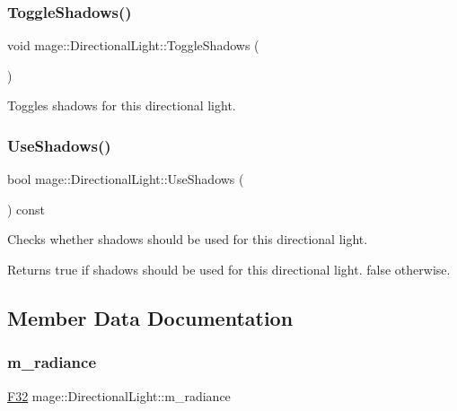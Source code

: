 \subsubsection{\texorpdfstring{Toggle\+Shadows()}{ToggleShadows()}}
{\footnotesize\ttfamily void mage\+::\+Directional\+Light\+::\+Toggle\+Shadows (\begin{DoxyParamCaption}{ }\end{DoxyParamCaption})\hspace{0.3cm}{\ttfamily [noexcept]}}

Toggles shadows for this directional light. \hypertarget{classmage_1_1_directional_light_a645e7f3d3e4dc4ebf11d7a6aa6950a18}{}\label{classmage_1_1_directional_light_a645e7f3d3e4dc4ebf11d7a6aa6950a18} 
\subsubsection{\texorpdfstring{Use\+Shadows()}{UseShadows()}}
{\footnotesize\ttfamily bool mage\+::\+Directional\+Light\+::\+Use\+Shadows (\begin{DoxyParamCaption}{ }\end{DoxyParamCaption}) const\hspace{0.3cm}{\ttfamily [noexcept]}}

Checks whether shadows should be used for this directional light.

\begin{DoxyReturn}{Returns}
{\ttfamily true} if shadows should be used for this directional light. {\ttfamily false} otherwise. 
\end{DoxyReturn}


\subsection{Member Data Documentation}
\hypertarget{classmage_1_1_directional_light_aedba48c9e2590284f804ba7cc6225ec3}{}\label{classmage_1_1_directional_light_aedba48c9e2590284f804ba7cc6225ec3} 
\subsubsection{\texorpdfstring{m\+\_\+radiance}{m\_radiance}}
{\footnotesize\ttfamily \hyperlink{namespacemage_aa97e833b45f06d60a0a9c4fc22ae02c0}{F32} mage\+::\+Directional\+Light\+::m\+\_\+radiance\hspace{0.3cm}{\ttfamily [private]}}

